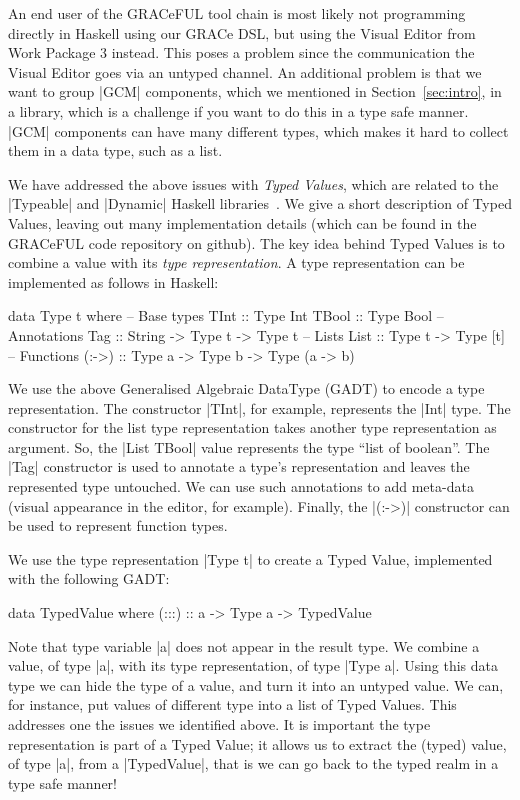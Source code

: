 \documentclass{article}
\begin{document}
An end user of the GRACeFUL tool chain is most likely not programming
directly in Haskell using our GRACe DSL, but using the Visual Editor
from Work Package 3 instead.
%
This poses a problem since the communication the Visual Editor goes
via an untyped channel.
%
An additional problem is that we want to group |GCM| components, which
we mentioned in Section~\ref{sec:intro}, in a library, which is a
challenge if you want to do this in a type safe manner.
%
|GCM| components can have many different types, which makes it hard to
collect them in a data type, such as a list.

We have addressed the above issues with \emph{Typed Values}, which are
related to the |Typeable| and |Dynamic| Haskell
libraries~\cite{DataDynamic}.
%
We give a short description of Typed Values, leaving out many
implementation details (which can be found in the GRACeFUL code
repository on github).
%
The key idea behind Typed Values is to combine a value with its
\emph{type representation}.
%
A type representation can be implemented as follows in Haskell:
%
\begin{haskellcode}
data Type t where
  -- Base types
  TInt   :: Type Int
  TBool  :: Type Bool
  -- Annotations
  Tag   :: String -> Type t -> Type t
  -- Lists
  List  :: Type t -> Type [t]
  -- Functions
  (:->) :: Type a -> Type b -> Type (a -> b)
\end{haskellcode}
%
We use the above Generalised Algebraic DataType (GADT) to encode a
type representation.
%
The constructor |TInt|, for example, represents the |Int| type.
%
The constructor for the list type representation takes another type
representation as argument.
%
So, the |List TBool| value represents the type ``list of boolean''.
%
The |Tag| constructor is used to annotate a type's representation and
leaves the represented type untouched.
%
We can use such annotations to add meta-data (visual appearance in the
editor, for example).
%
Finally, the |(:->)| constructor can be used to represent function
types.

We use the type representation |Type t| to create a Typed Value,
implemented with the following GADT:
%
\begin{haskellcode}
data TypedValue where
  (:::) :: a -> Type a -> TypedValue
\end{haskellcode}
%
Note that type variable |a| does not appear in the result type.
%
We combine a value, of type |a|, with its type representation, of type
|Type a|.
%
Using this data type we can hide the type of a value, and turn it into
an untyped value.
%
We can, for instance, put values of different type into a list of
Typed Values.
%
This addresses one the issues we identified above.
%
It is important the type representation is part of a Typed Value;
%
it allows us to extract the (typed) value, of type |a|, from a
|TypedValue|, that is we can go back to the typed realm in a type safe
manner!
\end{document}
